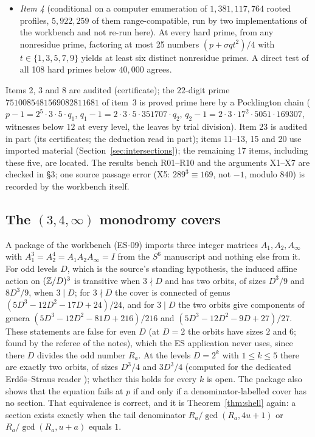 \begin{itemize}
\item \emph{Item 4} (conditional on a computer enumeration of $1{,}381{,}117{,}764$ rooted profiles, $5{,}922{,}259$ of them range-compatible, run by two implementations of the workbench and not re-run here). At every hard prime, from any nonresidue prime, factoring at most 25 numbers $(p+\sigma qt^2)/4$ with $t\in\{1,3,5,7,9\}$ yields at least six distinct nonresidue primes. A direct test of all 108 hard primes below $40{,}000$ agrees.
\end{itemize}
Items 2, 3 and 8 are audited (certificate); the $22$-digit prime $7510085481569082811681$ of item~3 is proved prime here by a Pocklington chain ($p-1=2^5\cdot3\cdot5\cdot q_1$, $q_1-1=2\cdot3\cdot5\cdot351707\cdot q_2$, $q_2-1=2\cdot3\cdot17^2\cdot5051\cdot169307$, witnesses below $12$ at every level, the leaves by trial division). Item 23 is audited in part (its certificates; the deduction read in part); items 11--13, 15 and 20 use imported material (Section~\ref{sec:intersections}); the remaining 17 items, including these five, are located. The results bench R01--R10 and the arguments X1--X7 are checked in  §3; one source passage error (X5: $289^3\equiv169$, not $-1$, modulo $840$) is recorded by the workbench itself.

\subsection{The \texorpdfstring{$(3,4,\infty)$}{(3,4,infinity)} monodromy covers}\label{ssec:es-s6}

A package of the workbench (ES-09) imports three integer matrices $A_1,A_2,A_\infty$ with $A_1^3=A_2^4=A_1A_2A_\infty=I$ from the $S^6$ manuscript \cite{AlpogeS6} and nothing else from it.
For odd levels $D$, which is the source's standing hypothesis, the induced affine action on $(\mathbb{Z}/D)^3$ is transitive when $3\nmid D$ and has two orbits, of sizes $D^3/9$ and $8D^3/9$, when $3\mid D$; for $3\nmid D$ the cover is connected of genus $(5D^3-12D^2-17D+24)/24$, and for $3\mid D$ the two orbits give components of genera $(5D^3-12D^2-81D+216)/216$ and $(5D^3-12D^2-9D+27)/27$.
These statements are false for even $D$ (at $D=2$ the orbits have sizes $2$ and $6$; found by the referee of the notes), which the ES application never uses, since there $D$ divides the odd number $R_a$. At the levels $D=2^k$ with $1\le k\le5$ there are exactly two orbits, of sizes $D^3/4$ and $3D^3/4$ (computed for the dedicated Erdős--Straus reader \cite[§5.2]{ESReader}); whether this holds for every $k$ is open.
The package also shows that the equation fails at $p$ if and only if a denominator-labelled cover has no section. That equivalence is correct, and it is Theorem~\ref{thm:shell} again: a section exists exactly when the tail denominator $R_a/\gcd(R_a,4u+1)$ or $R_a/\gcd(R_a,u+a)$ equals $1$.

